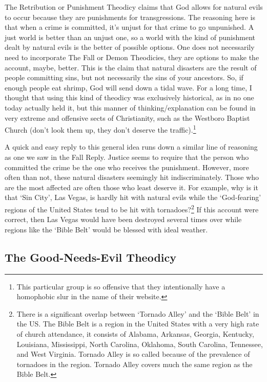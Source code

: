 The Retribution or Punishment Theodicy claims that God allows for natural evils to occur because they are punishments for transgressions. The reasoning here is that when a crime is committed, it's unjust for that crime to go unpunished. A just world is better than an unjust one, so a world with the kind of punishment dealt by natural evils is the better of possible options. One does not necessarily need to incorporate The Fall or Demon Theodicies, they are options to make the account, maybe, better. This is the claim that natural disasters are the result of people committing sins, but not necessarily the sins of your ancestors. So, if enough people eat shrimp, God will send down a tidal wave. For a long time, I thought that using this kind of theodicy was exclusively historical, as in no one today actually held it, but this manner of thinking/explanation can be found in very extreme and offensive sects of Christianity, such as the Westboro Baptist Church (don't look them up, they don't deserve the traffic).\footnote{This particular group is so offensive that they intentionally have a homophobic slur in the name of their website.} 

A quick and easy reply to this general idea runs down a similar line of reasoning as one we saw in the Fall Reply. Justice seems to require that the person who committed the crime be the one who receives the punishment. However, more often than not, these natural disasters seemingly hit indiscriminately. Those who are the most affected are often those who least deserve it. For example, why is it that `Sin City', Las Vegas, is hardly hit with natural evils while the `God-fearing' regions of the United States tend to be hit with tornadoes?\footnote{There is a significant overlap between `Tornado Alley' and the `Bible Belt' in the US. The Bible Belt is a region in the United States with a very high rate of church attendance, it consists of Alabama, Arkansas, Georgia, Kentucky, Louisiana, Mississippi, North Carolina, Oklahoma, South Carolina, Tennessee, and West Virginia. Tornado Alley is so called because of the prevalence of tornadoes in the region. Tornado Alley covers much the same region as the Bible Belt.}  If this account were correct, then Las Vegas would have been destroyed several times over while regions like the `Bible Belt' would be blessed with ideal weather. 

\subsection{The Good-Needs-Evil Theodicy}

